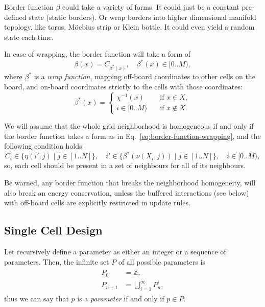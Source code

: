\documentclass[a4paper,12pt,tikz,UTF8]{article}
\begin{document}
    Border function $\beta$ could take a variety of forms. It could just be a constant pre-defined state (static borders). Or wrap borders into higher dimensional manifold topology, like torus, M{\"o}ebius strip or Klein bottle. It could even yield a random state each time.

    In case of wrapping, the border function will take a form of
    \begin{equation}
      \label{eq:border-function-wrapping}
      \beta(x) = C_{\beta^*(x)}, \quad \beta^*(x) \in {[0 .. M)},
    \end{equation}
    where $\beta^*$ is a \textit{wrap function}, mapping off-board coordinates to other cells on the board, and on-board coordinates strictly to the cells with those coordinates:
    \begin{equation}
      \beta^*(x) = 
      \begin{cases}
        \chi^{-1}(x) & \quad \text{if } x \in X,\\
        i \in {[0 .. M)} & \quad \text{if } x \notin X.
      \end{cases}
    \end{equation}

    We will assume that the whole grid neighborhood is homogeneous if and only if the border function takes a form as in Eq.~\ref{eq:border-function-wrapping}, and the following condition holds:
    \begin{equation}
      C_i \in \{ \eta(i', j) \mid j \in {[1 .. N]} \}, \quad i' \in \{ \beta^*(\nu(X_i, j)) \mid j \in {[1 .. N]} \}, \quad i \in {[0 .. M)},
    \end{equation}
    so, each cell should be present in a set of neighbours for all of its neighbours.

    Be warned, any border function that breaks the neighborhood homogeneity, will also break an energy conservation, unless the buffered interactions (see below) with off-board cells are explicitly restricted in update rules. 

  \subsection{Single Cell Design}

    Let recursively define a parameter as either an integer or a sequence of parameters. Then, the infinite set $P$ of all possible parameters is
    \begin{align}
      \begin{split}
        P_0 &= \mathbb{Z},\\
        P_{n + 1} &= \bigcup_{i=1}^\infty{P_n^i,}
      \end{split}
    \end{align}
    thus we can say that $p$ is a \textit{parameter} if and only if $p \in P$.
\end{document}
